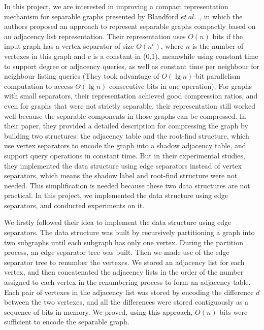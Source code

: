 \documentclass[12pt,glossary]{dalthesis}
\begin{document}
\bigskip


In this project, we are interested in improving a compact representation mechanism for separable graphs presented by Blandford $et \ al.$~\cite{compact-representation}, in which the authors proposed an approach to represent separable graphs compactly based on an adjacency list representation. Their representation uses $O(n)$ bits if the input graph has a vertex separator of size $O(n^{c})$, where $n$ is the number of vertexes in this graph and $c$ is a constant in (0,1), meanwhile using constant time to support degree or adjacency queries, as well as constant time per neighbour for neighbour listing queries (They took advantage of $O(\lg n)$-bit parallelism computation to access $\Theta(\lg n)$ consecutive bits in one operation). For graphs with small separators, their representation achieved good compression ratios, and even for graphs that were not strictly separable, their representation still worked well because the separable components in those graphs can be compressed. In their paper, they provided a detailed description for compressing the graph by building two structures: the adjacency table and the root-find structure, which use vertex separators to encode the graph into a shadow adjacency table, and support query operations in constant time. But in their experimental studies, they implemented the data structure using edge separators instead of vertex separators, which means the shadow label and root-find structure were not needed. This simplification is needed because these two data structures are not practical. In this project, we implemented the data structure using edge separators, and conducted experiments on it.

\bigskip
\bigskip

We firstly followed their idea to implement the data structure using edge separators. The data structure was built by recursively partitioning a graph into two subgraphs until each subgraph has only one vertex. During the partition process, an edge separator tree was built. Then we made use of the edge separator tree to renumber the vertexes. We stored an adjacency list for each vertex, and then concatenated the adjacency lists in the order of the number assigned to each vertex in the renumbering process to form an adjacency table. Each pair of vertexes in the adjacency list was stored by encoding the difference $d$ between the two vertexes, and all the differences were stored contiguously as a sequence of bits in memory. We proved, using this approach, $O(n)$ bits were sufficient to encode the separable graph. 
\end{document}

